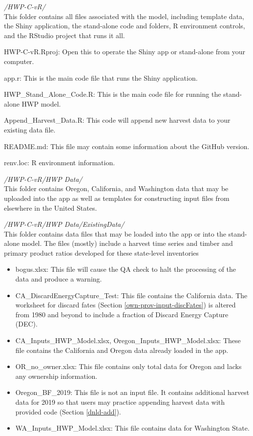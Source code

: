 \documentclass[
  openany]{book}
\begin{document}
\emph{/HWP-C-vR/}\\
This folder contains all files associated with the model, including template data, the Shiny application, the stand-alone code and folders, R environment controls, and the RStudio project that runs it all.

HWP-C-vR.Rproj: Open this to operate the Shiny app or stand-alone from your computer.

app.r: This is the main code file that runs the Shiny application.

HWP\_Stand\_Alone\_Code.R: This is the main code file for running the stand-alone HWP model.

Append\_Harvest\_Data.R: This code will append new harvest data to your existing data file.

README.md: This file may contain some information about the GitHub version.

renv.loc: R environment information.

\emph{/HWP-C-vR/HWP Data/}\\
This folder contains Oregon, California, and Washington data that may be uploaded into the app as well as templates for constructing input files from elsewhere in the United States.

\emph{/HWP-C-vR/HWP Data/ExistingData/}\\
This folder contains data files that may be loaded into the app or into the stand-alone model. The files (mostly) include a harvest time series and timber and primary product ratios developed for these state-level inventories

\begin{itemize}
\item
  bogus.xlsx: This file will cause the QA check to halt the processing of the data and produce a warning.
\item
  CA\_DiscardEnergyCapture\_Test: This file contains the California data. The worksheet for discard fates (Section \ref{own-prov-input-discFates}) is altered from 1980 and beyond to include a fraction of Discard Energy Capture (DEC).
\item
  CA\_Inputs\_HWP\_Model.xlsx, Oregon\_Inputs\_HWP\_Model.xlsx: These file contains the California and Oregon data already loaded in the app.
\item
  OR\_no\_owner.xlsx: This file contains only total data for Oregon and lacks any ownership information.
\item
  Oregon\_BF\_2019: This file is not an input file. It contains additional harvest data for 2019 so that users may practice appending harvest data with provided code (Section \ref{dnld-add}).
\item
  WA\_Inputs\_HWP\_Model.xlsx: This file contains data for Washington State.
\end{itemize}
\end{document}
